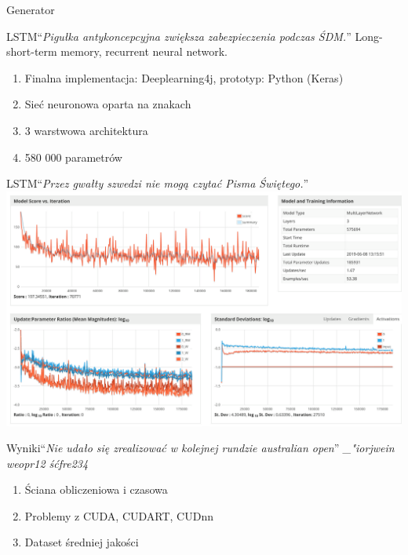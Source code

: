 \documentclass[14pt]{beamer}
\newcommand{\fakehead}[1]{``\textit{#1}''}
\begin{document}
\begin{section}{Generator}
	\begin{frame}{LSTM}{\fakehead{Pigułka antykoncepcyjna zwiększa zabezpieczenia podczas ŚDM.}}
		Long-short-term memory, recurrent neural network.
		\begin{enumerate}
			\item Finalna implementacja: Deeplearning4j, prototyp: Python (Keras)
			\item Sieć neuronowa oparta na znakach
			\item 3 warstwowa architektura
			\item 580 000 parametrów
		\end{enumerate}
	\end{frame}
	\begin{frame}[fragile]{LSTM}{\fakehead{Przez gwałty szwedzi nie mogą czytać Pisma Świętego.}}
		\includegraphics[width=\linewidth]{lstm.png}
	\end{frame}
	\begin{frame}{Wyniki}{\fakehead{Nie udało się zrealizować w kolejnej rundzie australian open}}
			{\textit{\_"iorjwein weopr12 śćfre234}}
		\begin{enumerate}
			\item Ściana obliczeniowa i czasowa
			\item Problemy z CUDA, CUDART, CUDnn
			\item Dataset średniej jakości
		\end{enumerate}
	\end{frame}

\end{section}
\end{document}
